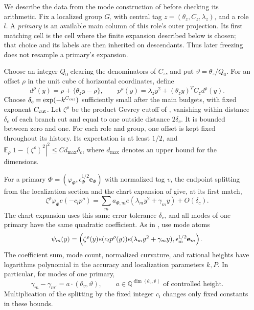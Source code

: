 We describe the data from the mode construction of
\cite[Section~8]{H} before checking its arithmetic.  Fix a localized
group \(G\), with central tag \(z=(\theta_z,C_z,\lambda_z)\), and
a role \(l\).  A \emph{primary} is an available main column of this
role's outer projection.  Its first matching cell is the cell where
the finite expansion described below is chosen; that choice and its
labels are then inherited on descendants.  Thus later freezing does
not resample a primary's expansion.

Choose an integer \(Q_0\) clearing the denominators of \(C_z\), and
put \(\vartheta=\theta_z/Q_0\).  For an offset \(\rho\) in the unit
cube of horizontal coordinates, define
\[
 d^\rho(y)=\rho+\{\theta_z y-\rho\},\qquad
 p^\rho(y)=\lambda_z y^2+(\theta_z y)^TC_zd^\rho(y).
\]
Choose \(\delta_c=\exp(-k^{C_{\rm cut}})\) sufficiently small after
the main budgets, with fixed exponent \(C_{\rm cut}\).
Let \(\zeta^\rho\) be the product Gevrey cutoff of
\cite[Section~8]{H}, vanishing within distance \(\delta_c\) of each
branch cut and equal to one outside distance \(2\delta_c\).
It is bounded between zero and one.  For each role and group,
one offset is kept fixed throughout its history.  Its expectation
is at least \(1/2\), and
\(\mathbb E_\rho|1-(\zeta^\rho)^2|^2\le C d_{\max}\delta_c\),
where \(d_{\max}\) denotes an upper bound for the dimensions.

For a primary \(\Phi=(\varphi_\Phi,\epsilon_\Phi^{1/2}\mathbf e_\Phi)\)
with normalized tag \(v\),
the endpoint splitting from the localization section and the chart
expansion of \cite[Lemma~4.4]{H} give, at its first match,
\[
 \zeta^\rho\varphi_\Phi e(-c_l p^\rho)
   =\sum_m a_{\Phi,m}e(\lambda_my^2+\gamma_my)+O(\delta_c).
\]
The chart expansion uses this same error tolerance \(\delta_c\),
and all modes of one primary have the same quadratic coefficient.  As in
\cite[Lemma~8.1]{H}, use mode atoms
\[
 \psi_m(y)=\left(
 \zeta^\rho(y)e(c_lp^\rho(y))e(\lambda_my^2+\gamma_my),
 \epsilon_{\rm m}^{1/2}\mathbf e_m\right).
\]
The coefficient sum, mode count, normalized curvature, and rational
heights have logarithms polynomial in the accuracy and localization
parameters \(k,P\).  In particular, for modes of one primary,
\begin{equation}\label{eq:mode-differences-b}
 \gamma_m-\gamma_{m'}=a\cdot(\theta_v,\vartheta),
 \qquad a\in\mathbb Q^{\dim(\theta_v,\vartheta)}
 \text{ of controlled height}.
\end{equation}
Multiplication of the splitting by the fixed integer \(c_l\) changes
only fixed constants in these bounds.

